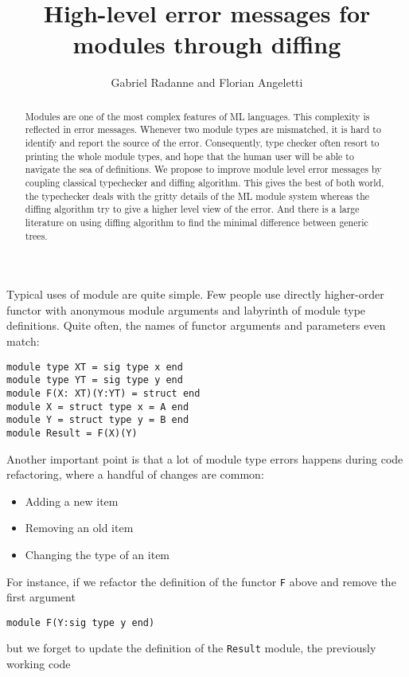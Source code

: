 \documentclass{article}
\title{High-level error messages for modules through diffing}
\author{Gabriel Radanne and Florian Angeletti}
\begin{document}
\maketitle

\begin{abstract}
Modules are one of the most complex features of ML languages. This complexity is reflected in error messages.
Whenever two module types are mismatched, it is hard to identify and report the source of the error.
Consequently, type checker often resort to printing the whole module types, and hope that the human user
will be able to navigate the sea of definitions.
We propose to improve module level error messages by coupling classical typechecker and diffing
algorithm. This gives the best of both world, the typechecker deals with the gritty details of
the ML module system whereas the diffing algorithm try to give a higher level view of the error.
And there is a large literature on using diffing algorithm to find the minimal difference between generic trees.
\end{abstract}


Typical uses of module are quite simple. Few people use directly higher-order functor with anonymous module arguments and labyrinth of module type definitions. Quite often, the names of functor arguments and parameters even match:
\begin{verbatim}
module type XT = sig type x end
module type YT = sig type y end
module F(X: XT)(Y:YT) = struct end
module X = struct type x = A end
module Y = struct type y = B end
module Result = F(X)(Y)
\end{verbatim}

Another important point is that a lot of module type errors happens during code refactoring, where a handful of changes are common:
\begin{itemize}
\item Adding a new item
\item Removing an old item
\item Changing the type of an item
\end{itemize}

For instance, if we refactor the definition of the functor \texttt{F} above and remove the first argument

\begin{verbatim}
module F(Y:sig type y end)
\end{verbatim}

but we forget to update the definition of the \texttt{Result} module, the previously working code
\end{document}
